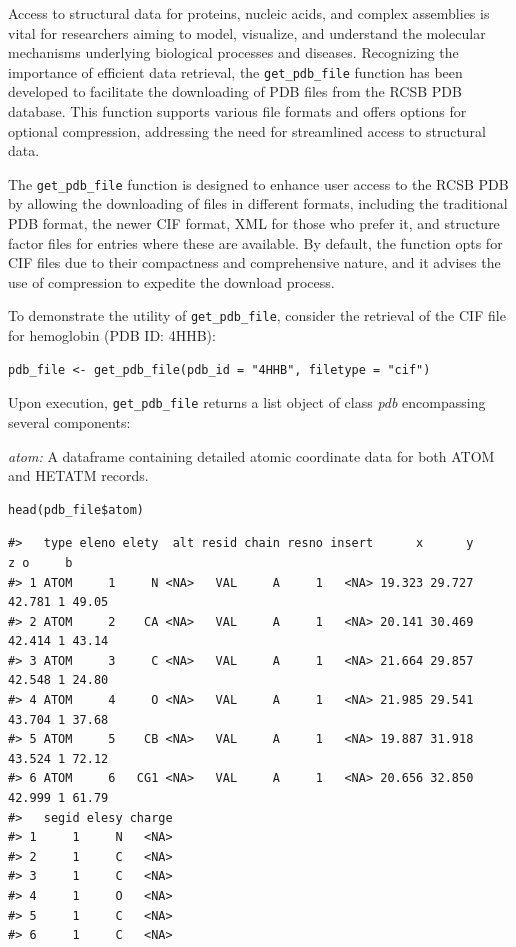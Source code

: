 Access to structural data for proteins, nucleic acids, and complex assemblies is vital for researchers aiming to model, visualize, and understand the molecular mechanisms underlying biological processes and diseases. Recognizing the importance of efficient data retrieval, the \texttt{get\_pdb\_file} function has been developed to facilitate the downloading of PDB files from the RCSB PDB database. This function supports various file formats and offers options for optional compression, addressing the need for streamlined access to structural data.

The \texttt{get\_pdb\_file} function is designed to enhance user access to the RCSB PDB by allowing the downloading of files in different formats, including the traditional PDB format, the newer CIF format, XML for those who prefer it, and structure factor files for entries where these are available. By default, the function opts for CIF files due to their compactness and comprehensive nature, and it advises the use of compression to expedite the download process.

To demonstrate the utility of \texttt{get\_pdb\_file}, consider the retrieval of the CIF file for hemoglobin (PDB ID: 4HHB):

\begin{verbatim}
pdb_file <- get_pdb_file(pdb_id = "4HHB", filetype = "cif")
\end{verbatim}

Upon execution, \texttt{get\_pdb\_file} returns a list object of class \emph{pdb} encompassing several components:

\emph{atom:} A dataframe containing detailed atomic coordinate data for both ATOM and HETATM records.

\begin{verbatim}
head(pdb_file$atom)
\end{verbatim}

\begin{verbatim}
#>   type eleno elety  alt resid chain resno insert      x      y      z o     b
#> 1 ATOM     1     N <NA>   VAL     A     1   <NA> 19.323 29.727 42.781 1 49.05
#> 2 ATOM     2    CA <NA>   VAL     A     1   <NA> 20.141 30.469 42.414 1 43.14
#> 3 ATOM     3     C <NA>   VAL     A     1   <NA> 21.664 29.857 42.548 1 24.80
#> 4 ATOM     4     O <NA>   VAL     A     1   <NA> 21.985 29.541 43.704 1 37.68
#> 5 ATOM     5    CB <NA>   VAL     A     1   <NA> 19.887 31.918 43.524 1 72.12
#> 6 ATOM     6   CG1 <NA>   VAL     A     1   <NA> 20.656 32.850 42.999 1 61.79
#>   segid elesy charge
#> 1     1     N   <NA>
#> 2     1     C   <NA>
#> 3     1     C   <NA>
#> 4     1     O   <NA>
#> 5     1     C   <NA>
#> 6     1     C   <NA>
\end{verbatim}

